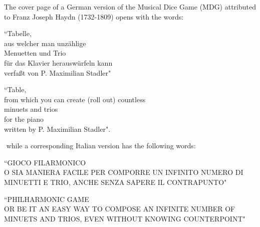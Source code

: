 \documentclass[a4paper,x11names,svgnames,10pt]{article}
\begin{document}
{The cover page of a German version of the Musical Dice Game (MDG) attributed to Franz Joseph Haydn (1732-1809) opens with the words: 
	\begin{center}
	\begin{minipage}{0.4\textwidth}
	\begin{flushleft}
		\begin{center}
			``Tabelle, \\
			{\scriptsize aus  welcher man unz\"{a}hlige}\\ 
			{\small Menuetten und Trio} \\
			{\footnotesize f\"{u}r das Klavier herausw\"{u}rfeln kann}\\
			{\footnotesize verfaßt von P. Maximilian Stadler}"\\
		\end{center}
	\end{flushleft}
	\end{minipage}
	\begin{minipage}{0.4\textwidth}
	\begin{flushright}
		\begin{center}
		``Table, \\
		{\scriptsize from which you can create (roll out) countless}\\ 
		{\small minuets and trios}\\ 
		{\footnotesize for the piano}\\
		{\footnotesize written by P. Maximilian Stadler}".
	\end{center}
	\end{flushright}
	\end{minipage}
	\end{center}

${}$\newline
while a corresponding Italian version has the following words:
	\begin{center}
	\begin{minipage}{0.4\textwidth}
		\begin{flushleft}
			\begin{center}
				``GIOCO FILARMONICO \\
				{\footnotesize O SIA MANIERA FACILE PER COMPORRE UN INFINITO NUMERO DI MINUETTI E TRIO, ANCHE SENZA SAPERE IL CONTRAPUNTO}"\\
			\end{center}
		\end{flushleft}
	\end{minipage}
	\begin{minipage}{0.4\textwidth}
		\begin{flushright}
			\begin{center}
				``PHILHARMONIC GAME \\ 
				{\footnotesize OR BE IT AN EASY WAY TO COMPOSE AN INFINITE NUMBER OF MINUETS AND TRIOS, EVEN WITHOUT KNOWING COUNTERPOINT}"\\
			\end{center}
		\end{flushright}
	\end{minipage}
\end{center}

}
\end{document}
